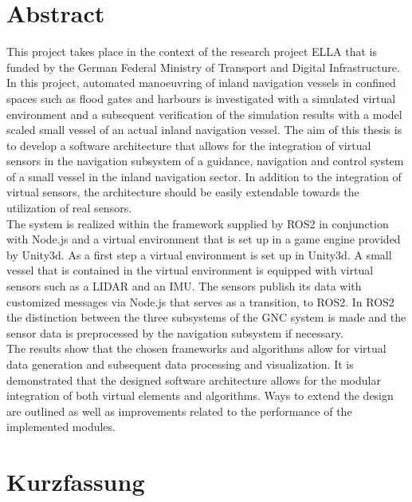 \chapter*{Abstract}
This project takes place in the context of the research project \ac{ELLA} that is funded by the German Federal Ministry of Transport and Digital Infrastructure. In this project, automated  manoeuvring of inland navigation vessels in confined spaces such as flood gates and harbours is investigated with a simulated virtual environment and a subsequent verification of the simulation results with a model scaled small vessel of an actual inland navigation vessel. The aim of this thesis is to develop a software architecture that allows for the integration of virtual sensors in the navigation subsystem of a guidance, navigation and control system of a small vessel in the inland navigation sector. In addition to the integration of virtual sensors, the architecture should be easily extendable towards the utilization of real sensors.\\
 
The system is realized within the framework supplied by ROS2 in conjunction with Node.js and a virtual environment that is set up in a game engine provided by Unity3d. As a first step a virtual environment is set up in Unity3d. A small vessel that is contained in the virtual environment is equipped with virtual sensors such as a \ac{LIDAR} and an \ac{IMU}. The sensors publish its data with customized messages via Node.js that serves as a transition, to ROS2. In ROS2 the distinction between the three subsystems of the \ac{GNC} system is made and the sensor data is preprocessed by the navigation subsystem if necessary.\\

The results show that the chosen frameworks and algorithms allow for virtual data generation and subsequent data processing and visualization. It is demonstrated that the designed software architecture allows for the modular integration of  both virtual elements and algorithms. Ways to extend the design are outlined as well as improvements related to the performance of the implemented modules.
\chapter*{Kurzfassung}

